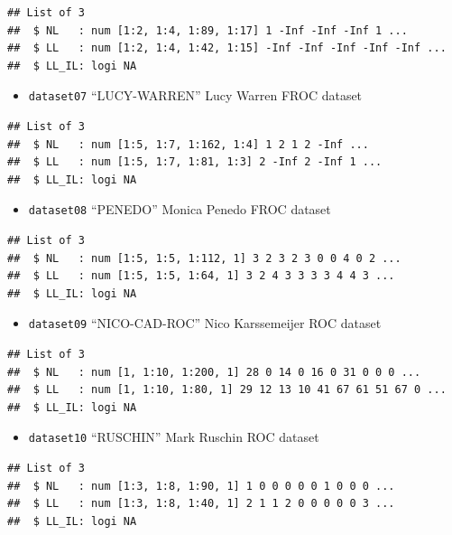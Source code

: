 \documentclass[
]{book}
\providecommand{\tightlist}{%
  \setlength{\itemsep}{0pt}\setlength{\parskip}{0pt}}
\begin{document}
\begin{verbatim}
## List of 3
##  $ NL   : num [1:2, 1:4, 1:89, 1:17] 1 -Inf -Inf -Inf 1 ...
##  $ LL   : num [1:2, 1:4, 1:42, 1:15] -Inf -Inf -Inf -Inf -Inf ...
##  $ LL_IL: logi NA
\end{verbatim}

\begin{itemize}
\tightlist
\item
  \texttt{dataset07} ``LUCY-WARREN'' Lucy Warren FROC dataset \citep{RN2507}
\end{itemize}

\begin{verbatim}
## List of 3
##  $ NL   : num [1:5, 1:7, 1:162, 1:4] 1 2 1 2 -Inf ...
##  $ LL   : num [1:5, 1:7, 1:81, 1:3] 2 -Inf 2 -Inf 1 ...
##  $ LL_IL: logi NA
\end{verbatim}

\begin{itemize}
\tightlist
\item
  \texttt{dataset08} ``PENEDO'' Monica Penedo FROC dataset \citep{RN1520}
\end{itemize}

\begin{verbatim}
## List of 3
##  $ NL   : num [1:5, 1:5, 1:112, 1] 3 2 3 2 3 0 0 4 0 2 ...
##  $ LL   : num [1:5, 1:5, 1:64, 1] 3 2 4 3 3 3 3 4 4 3 ...
##  $ LL_IL: logi NA
\end{verbatim}

\begin{itemize}
\tightlist
\item
  \texttt{dataset09} ``NICO-CAD-ROC'' Nico Karssemeijer ROC dataset \citep{hupse2013standalone}
\end{itemize}

\begin{verbatim}
## List of 3
##  $ NL   : num [1, 1:10, 1:200, 1] 28 0 14 0 16 0 31 0 0 0 ...
##  $ LL   : num [1, 1:10, 1:80, 1] 29 12 13 10 41 67 61 51 67 0 ...
##  $ LL_IL: logi NA
\end{verbatim}

\begin{itemize}
\tightlist
\item
  \texttt{dataset10} ``RUSCHIN'' Mark Ruschin ROC dataset \citep{RN1646}
\end{itemize}

\begin{verbatim}
## List of 3
##  $ NL   : num [1:3, 1:8, 1:90, 1] 1 0 0 0 0 0 1 0 0 0 ...
##  $ LL   : num [1:3, 1:8, 1:40, 1] 2 1 1 2 0 0 0 0 0 3 ...
##  $ LL_IL: logi NA
\end{verbatim}
\end{document}

